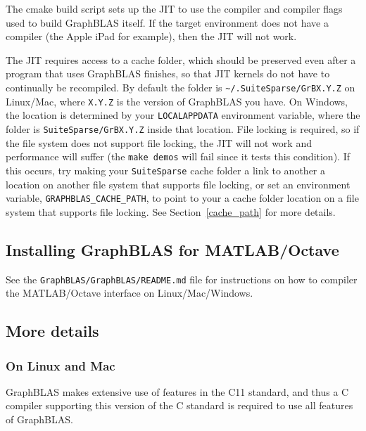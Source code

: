 The cmake build script sets up the JIT to use the compiler and compiler
flags used to build GraphBLAS itself.  If the target environment does not
have a compiler (the Apple iPad for example), then the JIT will not work.

The JIT requires access to a cache folder, which should be preserved
even after a program that uses GraphBLAS finishes, so that JIT kernels do not
have to continually be recompiled.  By default the folder is
\verb'~/.SuiteSparse/GrBX.Y.Z' on Linux/Mac, where \verb'X.Y.Z' is the version
of GraphBLAS you have.  On Windows, the location is determined by your
\verb'LOCALAPPDATA' environment variable, where the folder is
\verb'SuiteSparse/GrBX.Y.Z' inside that location.  File locking is required,
so if the file system does not support file locking, the JIT will not work and
performance will suffer (the \verb'make demos' will fail since it tests this
condition).  If this occurs, try making your \verb'SuiteSparse' cache folder
a link to another a location on another file system that supports file locking,
or set an environment variable, \verb'GRAPHBLAS_CACHE_PATH', to point to your
a cache folder location on a file system that supports file locking.
See Section~\ref{cache_path} for more details.

\subsection{Installing GraphBLAS for MATLAB/Octave}

See the \verb'GraphBLAS/GraphBLAS/README.md' file for instructions on
how to compiler the MATLAB/Octave interface on Linux/Mac/Windows.

\subsection{More details}

\subsubsection{On Linux and Mac}

GraphBLAS makes extensive use of features in the C11 standard, and thus a
C compiler supporting this version of the C standard is required to use
all features of GraphBLAS.

